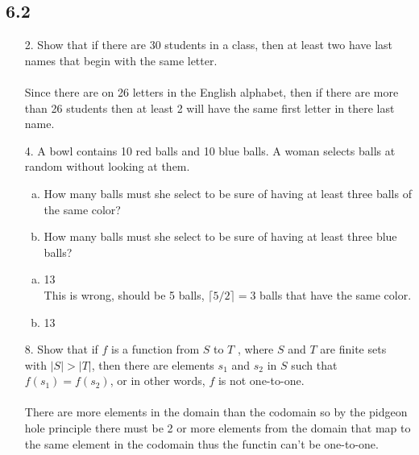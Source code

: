 \subsection{6.2}
\begin{itemize}
    \item[2.]  Show that if there are 30 students in a class, then at least
          two have last names that begin with the same letter. \\
          \answer \\
          Since there are on 26 letters in the English alphabet, then if there are more
          than 26 students then at least 2 will have the same first letter in there last name.

    \item[4.] A bowl contains 10 red balls and 10 blue balls. A woman
          selects balls at random without looking at them.
          \begin{enumerate}[a.]
              \item How many balls must she select to be sure of having at least three balls of the same color?
              \item How many balls must she select to be sure of having at least three blue balls?
          \end{enumerate}
          \answer
          \begin{enumerate}[a.]
              \item 13 \\
              {\color{red} This is wrong, should be 5 balls, $\lceil 5/2 \rceil = 3$ balls that have the same color.}
              \item 13
          \end{enumerate}

    \item[8.]  Show that if $f$ is a function from $S$ to $T$ , where $S$ and $T$
          are finite sets with $|S| > |T|$, then there are elements $s_1$
          and $s_2$ in $S$ such that $f(s_1 ) = f (s_2)$, or in other words, $f$
          is not one-to-one. \\
          \answer \\
          There are more elements in the domain than the codomain so by the pidgeon hole
          principle there must be 2 or more elements from the domain that map to the
          same element in the codomain thus the functin can't be one-to-one.


\end{itemize}
